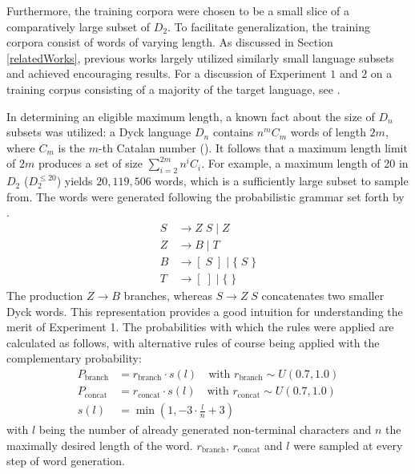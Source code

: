 Furthermore, the training corpora were chosen to be a small slice of a comparatively large subset of $D_{2}$. To facilitate generalization, the training corpora consist of words of varying length. As discussed in Section \ref{relatedWorks}, previous works largely utilized similarly small language subsets and achieved encouraging results. For a discussion of Experiment $1$ and $2$ on a training corpus consisting of a majority of the target language, see \cite{Bernardy2018}.

In determining an eligible maximum length, a known fact about the size of $D_{n}$ subsets was utilized: a Dyck language $D_{n}$ contains $n^mC_{m}$ words of length $2m$, where $C_{m}$ is the $m$-th Catalan number (\cite{Skachkova2018}). It follows that a maximum length limit of $2m$ produces a set of size $\sum_{i=2}^{2m}n^{i}C_{i}$. For example, a maximum length of 20 in $D_{2}$ ($D_{2}^{\leq 20}$) yields $20{,}119{,}506$ words, which is a sufficiently large subset to sample from. The words were generated following the probabilistic grammar set forth by \cite{Sennhauser2018}.
\begin{align*}
	S &\rightarrow Z \; S \; \vert \; Z \\
	Z &\rightarrow B \; \vert \; T \\
	B &\rightarrow [ \; S \; ] \; \vert \; \lbrace \; S \; \rbrace \\
	T &\rightarrow [ \; ] \; \vert \; \lbrace \; \rbrace
\end{align*}
The production $Z \rightarrow B$ branches, whereas $S \rightarrow Z \; S$ concatenates two smaller Dyck words. This representation provides a good intuition for understanding the merit of Experiment 1. The probabilities with which the rules were applied are calculated as follows, with alternative rules of course being applied with the complementary probability:
\begin{align*}
	P_{\text{branch}} &= r_{\text{branch}} \cdot s(l) \quad \text{with } r_{\text{branch}} \sim U(0.7,1.0) \\
	P_{\text{concat}} &= r_{\text{concat}} \cdot s(l) \quad \text{with } r_{\text{concat}} \sim U(0.7,1.0) \\
	s(l) &= \min(1, -3 \cdot \frac{l}{n} + 3)
\end{align*}
with $l$ being the number of already generated non-terminal characters and $n$ the maximally desired length of the word. $r_{\text{branch}}$, $r_{\text{concat}}$ and $l$ were sampled at every step of word generation.

